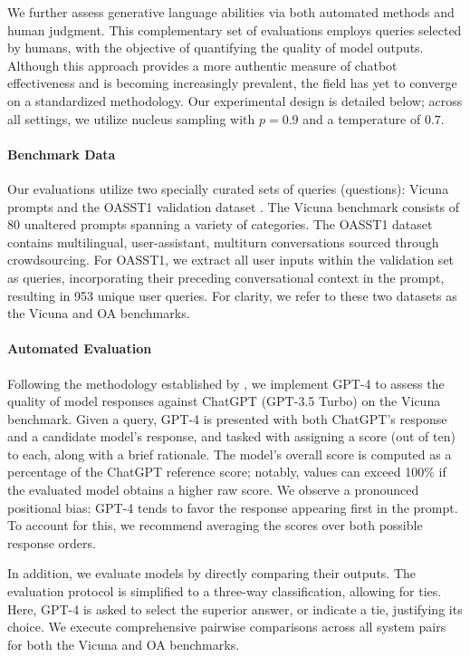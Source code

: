 We further assess generative language abilities via both automated methods and human judgment. This complementary set of evaluations employs queries selected by humans, with the objective of quantifying the quality of model outputs. Although this approach provides a more authentic measure of chatbot effectiveness and is becoming increasingly prevalent, the field has yet to converge on a standardized methodology. Our experimental design is detailed below; across all settings, we utilize nucleus sampling with $p=0.9$ and a temperature of $0.7$.

\paragraph{Benchmark Data} Our evaluations utilize two specially curated sets of queries (questions): Vicuna prompts \citep{vicuna2023} and the OASST1 validation dataset \citep{kopf2023openassistant}. The Vicuna benchmark consists of 80 unaltered prompts spanning a variety of categories. The OASST1 dataset contains multilingual, user-assistant, multiturn conversations sourced through crowdsourcing. For OASST1, we extract all user inputs within the validation set as queries, incorporating their preceding conversational context in the prompt, resulting in 953 unique user queries. For clarity, we refer to these two datasets as the Vicuna and OA benchmarks.

\paragraph{Automated Evaluation} Following the methodology established by \citet{vicuna2023}, we implement GPT-4 to assess the quality of model responses against ChatGPT (GPT-3.5 Turbo) on the Vicuna benchmark. Given a query, GPT-4 is presented with both ChatGPT’s response and a candidate model’s response, and tasked with assigning a score (out of ten) to each, along with a brief rationale. The model’s overall score is computed as a percentage of the ChatGPT reference score; notably, values can exceed 100\% if the evaluated model obtains a higher raw score. We observe a pronounced positional bias: GPT-4 tends to favor the response appearing first in the prompt. To account for this, we recommend averaging the scores over both possible response orders.

In addition, we evaluate models by directly comparing their outputs. The evaluation protocol is simplified to a three-way classification, allowing for ties. Here, GPT-4 is asked to select the superior answer, or indicate a tie, justifying its choice. We execute comprehensive pairwise comparisons across all system pairs for both the Vicuna and OA benchmarks.

